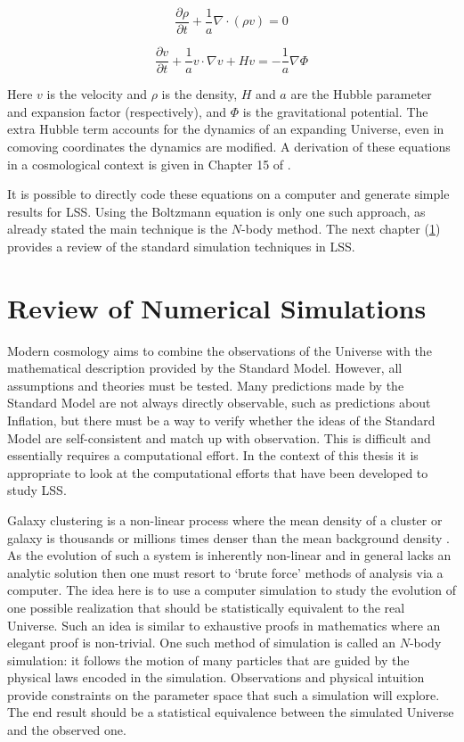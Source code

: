 \begin{equation}
\label{eqn_fluid}
\frac{\partial \rho}{\partial t} + \frac{1}{a} \nabla \cdot (\rho v) = 0
\end{equation}

\begin{equation}
\frac{\partial v}{\partial t} + \frac{1}{a} v \cdot \nabla v + H v = - \frac{1}{a} \nabla \Phi
\end{equation}

\noindent Here $v$ is the velocity and $\rho$ is the density, $H$ and $a$ are the Hubble parameter and expansion factor (respectively), and $\Phi$ is the gravitational potential. The extra Hubble term accounts for the dynamics of an expanding Universe, even in comoving coordinates the dynamics are modified. A derivation of these equations in a cosmological context is given in Chapter 15 of \citet{bib_pea}.

It is possible to directly code these equations on a computer and generate simple results for LSS. Using the Boltzmann equation is only one such approach, as already stated the main technique is the $N$-body method. The next chapter (\ref{ch_2}) provides a review of the standard simulation techniques in LSS.


\chapter{Review of Numerical Simulations}
\label{ch_2}
Modern cosmology aims to combine the observations of the Universe with the mathematical description provided by the Standard Model. However, all assumptions and theories must be tested. Many predictions made by the Standard Model are not always directly observable, such as predictions about Inflation, but there must be a way to verify whether the ideas of the Standard Model are self-consistent and match up with observation. This is difficult and essentially requires a computational effort. In the context of this thesis it is appropriate to look at the computational efforts that have been developed to study LSS.

Galaxy clustering is a non-linear process where the mean density of a cluster or galaxy is thousands or millions times denser than the mean background density \citep{bib_pea}. As the evolution of such a system is inherently non-linear and in general lacks an analytic solution then one must resort to `brute force' methods of analysis via a computer. The idea here is to use a computer simulation to study the evolution of one possible realization that should be statistically equivalent to the real Universe. Such an idea is similar to exhaustive proofs in mathematics where an elegant proof is non-trivial. One such method of simulation is called an $N$-body simulation: it follows the motion of many particles that are guided by the physical laws encoded in the simulation. Observations and physical intuition provide constraints on the parameter space that such a simulation will explore. The end result should be a statistical equivalence between the simulated Universe and the observed one.

